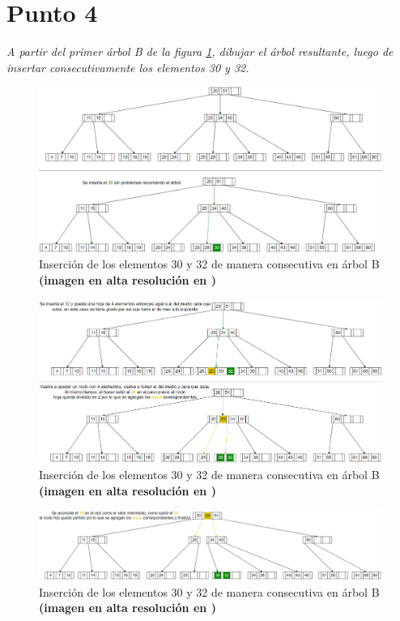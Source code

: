 \newpage
\section{Punto 4}
\textit{A partir del primer árbol B de la figura \ref{fig:Arbol1}, dibujar el árbol resultante, luego de insertar consecutivamente los
elementos 30 y 32.
}\\
\begin{figure}
  \centering
  \includegraphics[width=\textwidth, scale=1]{Images/Punto4/Arbol1.png}
  \caption{Inserción de los elementos 30 y 32 de manera consecutiva en árbol B \textbf{(imagen en alta resolución en \cite{arbolB})}}
  \label{fig:Arbol1}
\end{figure}

\begin{figure}
  \centering
  \includegraphics[width=\textwidth, scale=1]{Images/Punto4/Arbol2.png}
  \caption{Inserción de los elementos 30 y 32 de manera consecutiva en árbol B \textbf{(imagen en alta resolución en \cite{arbolB})}}
  \label{fig:Arbol2}
\end{figure}

\begin{figure}
  \centering
  \includegraphics[width=\textwidth, scale=1]{Images/Punto4/Arbol3.png}
  \caption{Inserción de los elementos 30 y 32 de manera consecutiva en árbol B \textbf{(imagen en alta resolución en \cite{arbolB})}}
  \label{fig:Arbol3}
\end{figure}
